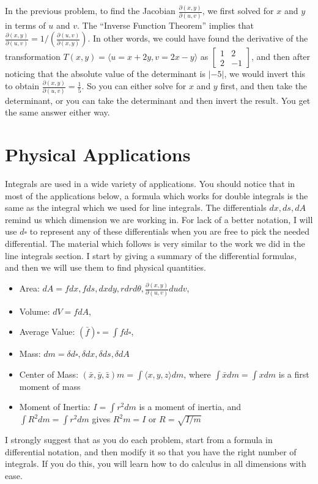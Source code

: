 In the previous problem, to find the Jacobian $\frac{\partial(x,y)}{\partial(u,v)}$,
we first solved for $x$ and $y$ in terms of $u$ and $v$. The ``Inverse
Function Theorem'' implies that $\frac{\partial(x,y)}{\partial(u,v)} =
1/\left(\frac{\partial(u,v)}{\partial(x,y)}\right)$. In other words, we could have
found the derivative of the transformation $T(x,y) = \langle u=x+2y,
v=2x-y\rangle$ as $\begin{bmatrix} 1&2\\2&-1\end{bmatrix}$, and then
after noticing that the absolute value of the determinant is $|-5|$,
we would invert this to obtain $\frac{\partial(x,y)}{\partial(u,v)} = \frac{1}{5}$.  So
you can either solve for $x$ and $y$ first, and then take the
determinant, or you can take the determinant and then invert the
result.  You get the same answer either way.


\section{Physical Applications}
Integrals are used in a wide variety of applications.  You should
notice that in most of the applications below, a formula which works
for double integrals is the same as the integral which we used for
line integrals.  The differentials $dx,ds,dA$ remind us which
dimension we are working in.  For lack of a better notation,  I will
use $d\square$ to represent any of these differentials when you are
free to pick the needed differential. The material which follows is
very similar to the work we did in the line integrals section. I start
by giving a summary of the differential formulas, and then we will use
them to find physical quantities.
\begin{itemize}
\item Area: $dA = fdx,fds, dxdy, rdrd\theta, \frac{\partial(x,y)}{\partial(u,v)}dudv$, 
\item Volume: $dV = fdA$, 
\item Average Value: $(\bar f)\square = \int fd\square$, 
\item Mass: $dm = \delta d\square , \delta dx, \delta ds, \delta dA$
\item Center of Mass: $(\bar x,\bar y,\bar z)m = \int\langle x,y,z\rangle
dm$, where $\int \bar x dm = \int x dm$ is a first moment of mass
\item Moment of Inertia: $I = \int r^2 dm$ is a moment of inertia, and $\int
R^2 dm = \int r^2 dm$ gives $R^2 m =I$ or $R=\sqrt{I/m}$
\end{itemize}
I strongly suggest that as you do each problem, start from a formula
in differential notation, and then modify it so that you have the
right number of integrals.  If you do this, you will learn how to do
calculus in all dimensions with ease. 

